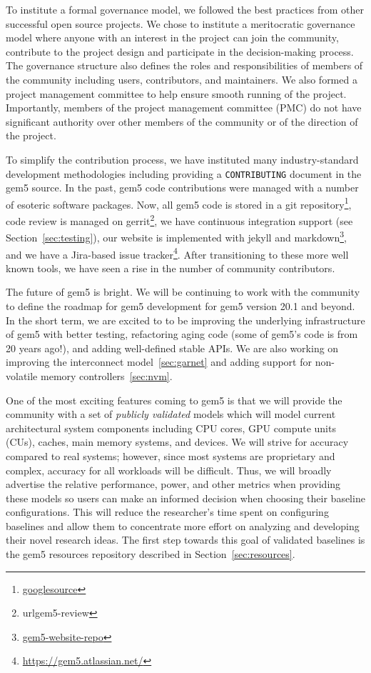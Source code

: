 To institute a formal governance model, we followed the best practices from other successful open source projects.
We chose to institute a meritocratic governance model where anyone with an interest in the project can join the community, contribute to the project design and participate in the decision-making process.
The governance structure also defines the roles and responsibilities of members of the community including users, contributors, and maintainers.
We also formed a project management committee to help ensure smooth running of the project.
Importantly, members of the project management committee (PMC) do not have significant authority over other members of the community or of the direction of the project.

To simplify the contribution process, we have instituted many industry-standard development methodologies including providing a \verb|CONTRIBUTING| document in the gem5 source.
In the past, gem5 code contributions were managed with a number of esoteric software packages.
Now, all gem5 code is stored in a git repository\footnote{\url{googlesource}}, code review is managed on gerrit\footnote{url{gem5-review}}, we have continuous integration support (see Section~\ref{sec:testing}), our website is implemented with jekyll and markdown\footnote{\url{gem5-website-repo}}, and we have a Jira-based issue tracker\footnote{\url{https://gem5.atlassian.net/}}.
After transitioning to these more well known tools, we have seen a rise in the number of community contributors.

The future of gem5 is bright.
We will be continuing to work with the community to define the roadmap for gem5 development for gem5 version 20.1 and beyond.
In the short term, we are excited to to be improving the underlying infrastructure of gem5 with better testing, refactoring aging code (some of gem5's code is from 20 years ago!), and adding well-defined stable APIs.
We are also working on improving the interconnect model~\ref{sec:garnet} and adding support for non-volatile memory controllers~\ref{sec:nvm}.

One of the most exciting features coming to gem5 is that we will provide the community with a set of \emph{publicly validated} models which will model current architectural system components including CPU cores, GPU compute units (CUs), caches, main memory systems, and devices.
We will strive for accuracy compared to real systems; however, since most systems are proprietary and complex, accuracy for all workloads will be difficult.
Thus, we will broadly advertise the relative performance, power, and other metrics when providing these models so users can make an informed decision when choosing their baseline configurations.
This will reduce the researcher's time spent on configuring baselines and allow them to concentrate more effort on analyzing and developing their novel research ideas.
The first step towards this goal of validated baselines is the gem5 resources repository described in Section~\ref{sec:resources}.


